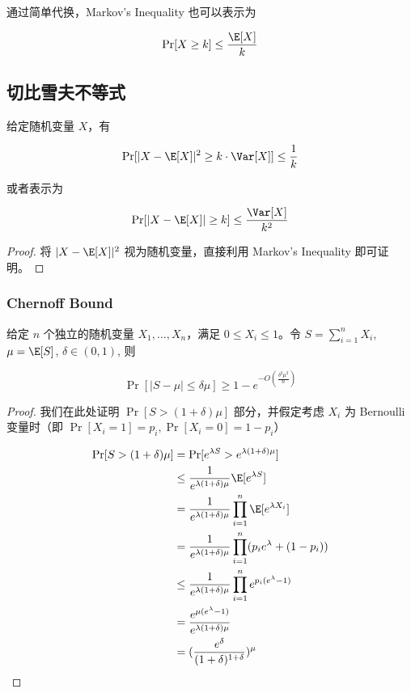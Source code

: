 \documentclass[lang=cn,newtx,10pt,scheme=chinese,chinesefont=nofont,citestyle=gb7714-2015, bibstyle=gb7714-2015]{elegantbook}
\begin{document}
\begin{refsection}
通过简单代换，Markov's Inequality 也可以表示为

\begin{equation*}
    \Pr[X\ge k] \le\frac{\E[X]}{k}
\end{equation*}
\subsection{切比雪夫不等式}

\begin{theorem}
给定随机变量 $X$，有

\begin{equation*}
    \Pr[|X-\E[X]|^2 \ge k\cdot \Var[X]] \le \frac{1}{k}
\end{equation*}

\noindent 或者表示为

\begin{equation*}
    \Pr[|X-\E[X]| \ge k] \le \frac{\Var[X]}{k^2} 
\end{equation*}
\end{theorem}


\begin{proof}
    将 $|X-\E[X]|^2$ 视为随机变量，直接利用 Markov's Inequality 即可证明。
\end{proof}

\subsubsection{Chernoff Bound}

\begin{theorem}
给定 $n$ 个独立的随机变量 $X_1,\dots, X_n$，满足 $0\le X_i\le 1$。令 $S=\sum_{i=1}^n X_i$, $\mu = \E[S]$, $\delta\in(0, 1)$, 则

\begin{equation}
    \Pr[|S-\mu| \le \delta \mu] \ge 1 - e^{-O(\frac{\delta^2\mu^2}{n})} \label{chernoff}
\end{equation}
\end{theorem}


\begin{proof}
    我们在此处证明 $\Pr[S > (1+\delta)\mu]$ 部分，并假定考虑 $X_i$ 为 Bernoulli 变量时（即 $\Pr[X_i=1]=p_i, \Pr[X_i=0]=1-p_i$）

\begin{align}
    \Pr[S>(1+\delta)\mu] &= \Pr[e^{\lambda S} > e^{\lambda(1+\delta)\mu}] \notag \\
    &\le \frac{1}{e^{\lambda(1+\delta)\mu}}\E[e^{\lambda S}] \label{chernoff_markov} \\
    &= \frac{1}{e^{\lambda(1+\delta)\mu}}\prod_{i=1}^n\E[e^{\lambda X_i}] \label{chernoff_independent} \\
    &= \frac{1}{e^{\lambda(1+\delta)\mu}}\prod_{i=1}^n (p_ie^\lambda + (1-p_i)) \notag \\
    &\le \frac{1}{e^{\lambda(1+\delta)\mu}}\prod_{i=1}^n e^{p_i(e^\lambda - 1)} \label{chernoff_ex} \\
    &= \frac{e^{\mu(e^\lambda-1)}}{e^{\lambda(1+\delta)\mu}} \notag \\
    &= (\frac{e^\delta}{(1+\delta)^{1+\delta}})^\mu \label{chernoff_result}
\end{align}


\end{proof}
\end{refsection}
\end{document}
